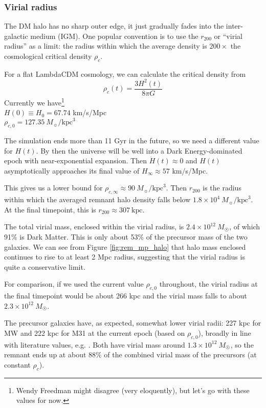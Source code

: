 \documentclass[twocolumn]{aastex63}
\begin{document}
\subsubsection{Virial radius}

The DM halo has no sharp outer edge, it just gradually fades into the inter-galactic medium (IGM). One popular convention is to use the $r_{200}$ or ``virial radius'' as a limit: the radius within which the average density is $200\times$ the cosmological critical density $\rho_c$.

For a flat LambdaCDM cosmology, we can calculate the critical density from
\[ \rho_c(t) = \frac{3 H^2(t)}{8 \pi G} \] 
Currently \citep{planck_collaboration_planck_2016} we have\footnote{Wendy Freedman might disagree (very eloquently), but let's go with these values for now.} \\
\-\hspace{10mm} $H(0) \equiv H_0 = 67.74$ km/s/Mpc \\
\-\hspace{10mm} $\rho_{c,0} = 127.35\ M_\sun/\text{kpc}^3$

The simulation ends more than 11 Gyr in the future, so we need a different value for $H(t)$. By then the universe will be well into a Dark Energy-dominated epoch with near-exponential expansion. Then $\dot{H}(t) \approx 0$ and $H(t)$ asymptotically approaches its final value of $H_{\infty} \approx 57$ km/s/Mpc.

This gives us a lower bound for $\rho_{c,\infty} \approx 90\ M_\sun/\text{kpc}^3$. Then $r_{200}$ is the radius within which the averaged remnant halo density falls below $1.8 \times 10^4\ M_\sun/\text{kpc}^3$. At the final timepoint, this is $r_{200} \approx 307\ \text{kpc}$.

The total virial mass, enclosed within the virial radius, is $2.4 \times 10^{12}\ M_\Sun$, of which 91\% is Dark Matter. This is only about 53\% of the precursor mass of the two galaxies. We can see from Figure \ref{fig:rem_mp_halo} that halo mass enclosed continues to rise to at least 2 Mpc radius, suggesting that the virial radius is quite a conservative limit.

For comparison, if we used the current value $\rho_{c,0}$ throughout, the virial radius at the final timepoint would be about 266 kpc and the virial mass falls to about $2.3 \times 10^{12}\ M_\Sun$. 

The precursor galaxies have, as expected, somewhat lower virial radii: 227 kpc for MW and 222 kpc for M31 at the current epoch (based on $\rho_{c,0}$), broadly in line with literature values, e.g. \citep{dehnen_velocity_2006}. Both have virial mass around $1.3 \times 10^{12}\ M_\Sun$, so the remnant ends up at about 88\% of the combined virial mass of the precursors (at constant $\rho_c$).
\end{document}
